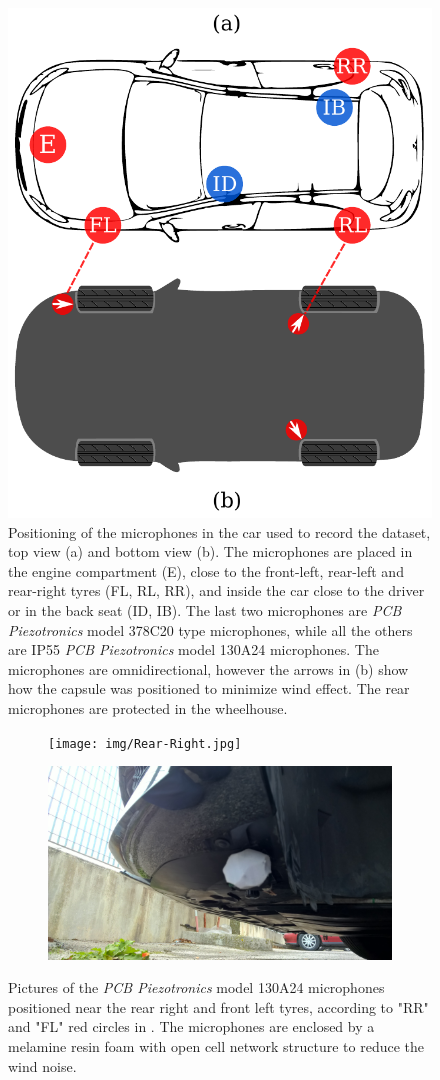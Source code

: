 \begin{figure}[ht]
	\centering
	\includegraphics[width=0.4\linewidth]{img/car-mic}
	\caption[Car equipment for dataset recording.]{Positioning of the microphones in the car used to record the dataset, top view (a) and bottom view (b). The microphones are placed in the engine compartment (E), close to the front-left, rear-left and rear-right tyres (FL, RL, RR), and inside the car close to the driver or in the back seat (ID, IB). The last two microphones are \textit{PCB Piezotronics} model 378C20 type microphones, while all the others are IP55 \textit{PCB Piezotronics} model 130A24 microphones. The microphones are omnidirectional, however the arrows in (b) show how the capsule was positioned to minimize wind effect. The rear microphones are protected in the wheelhouse.}
	\label{fig:car-mic}
\end{figure}

\begin{figure}[t]
	\centering
	\begin{subfigure}[b]{0.48\textwidth}
		\texttt{[image: img/Rear-Right.jpg]}
	\end{subfigure}
	\hfil
	\begin{subfigure}[b]{0.48\textwidth}
		\includegraphics[width=\textwidth]{img/Front-Left.jpg}
	\end{subfigure}
	
	
	\caption[Microphones positioning]{Pictures of the \textit{PCB Piezotronics} model 130A24 microphones positioned near the rear right and front left tyres, according to "RR" and "FL" red circles in . The microphones are enclosed by a melamine resin foam with open cell network structure to reduce the wind noise.}
	\label{fig:car-rr-and-fl}
\end{figure}


